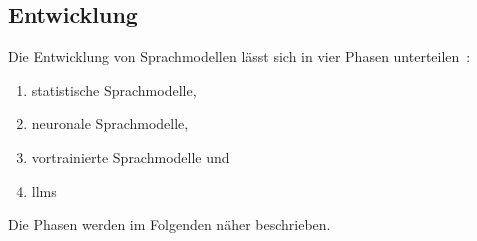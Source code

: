 \subsection{Entwicklung}

Die Entwicklung von Sprachmodellen lässt sich in vier Phasen unterteilen~\cite[1955]{llm05}: 

\begin{enumerate}
  \item statistische Sprachmodelle,
  \item neuronale Sprachmodelle,
  \item vortrainierte Sprachmodelle und
  \item \acp{llm}
\end{enumerate}

Die Phasen werden im Folgenden näher beschrieben.

